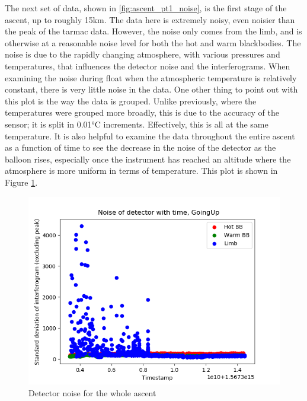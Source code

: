 The next set of data, shown in \ref{fig:ascent_pt1_noise}, is the first stage of the ascent, up to roughly 15km. The data here is extremely noisy, even noisier than the peak of the tarmac data. However, the noise only comes from the limb, and is otherwise at a reasonable noise level for both the hot and warm blackbodies. The noise is due to the rapidly changing atmosphere, with various pressures and temperatures, that influences the detector noise and the interferograms. When examining the noise during float when the atmospheric temperature is relatively constant, there is very little noise in the data. One other thing to point out with this plot is the way the data is grouped. Unlike previously, where the temperatures were grouped more broadly, this is due to the accuracy of the sensor; it is split in 0.01°C increments. Effectively, this is all at the same temperature. It is also helpful to examine the data throughout the entire ascent as a function of time to see the decrease in the noise of the detector as the balloon rises, especially once the instrument has reached an altitude where the atmosphere is more uniform in terms of temperature. This plot is shown in Figure \ref{fig:ascent_noisetime}.

\begin{figure}
\centering
  \includegraphics[width=0.8\linewidth]{mct_noise_temp_plots/goingup_allparts_noisevtime_colour.png}
  \caption{Detector noise for the whole ascent}
  \label{fig:ascent_noisetime}
\end{figure}

